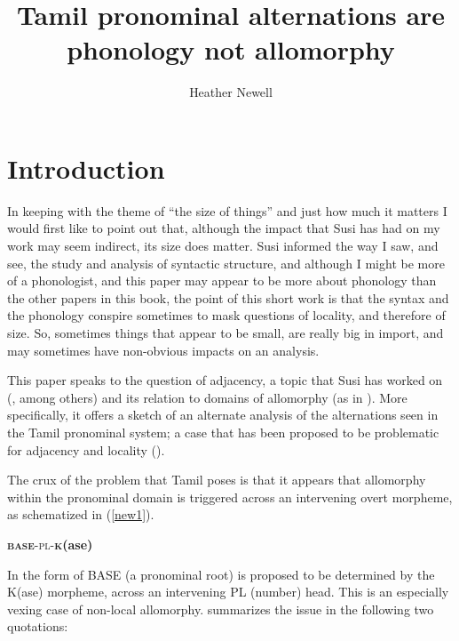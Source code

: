 \documentclass[output=paper]{langscibook}
\author{Heather Newell\affiliation{Université du Québec à Montréal}}
\title{Tamil pronominal alternations are phonology not allomorphy}
\begin{document}
\maketitle
\section{Introduction}

In keeping with the theme of “the size of things” and just how much it matters I would first like to point out that, although the impact that Susi has had on my work may seem indirect, its size does matter. Susi informed the way I saw, and see, the study and analysis of syntactic structure, and although I might be more of a phonologist, and this paper may appear to be more about phonology than the other papers in this book, the point of this short work is that the syntax and the phonology conspire sometimes to mask questions of locality, and therefore of size. So, sometimes things that appear to be small, are really big in import, and may sometimes have non-obvious impacts on an analysis.  

This paper speaks to the question of adjacency, a topic that Susi has worked on (\citealt{BobaljikWurmbrand2005newell,Wurmbrand2007newell}, among others) and its relation to domains of allomorphy (as in \citealt{BobaljikWurmbrand2013}). More specifically, it offers a sketch of an alternate analysis of the alternations seen in the Tamil pronominal system; a case that has been proposed to be problematic for adjacency and locality (\citealt{Moskal2015,moskal2016towards}). 

\begin{sloppypar}
The crux of the problem that Tamil poses is that it appears that allomorphy within the pronominal domain is triggered across an intervening overt morpheme, as schematized in (\ref{new1}).
\end{sloppypar}

\begin{exe}
\ex \label{new1}
 \textsc{\textbf{base}-pl-\textbf{k}}\textbf{(ase)}
\end{exe}

In  the form of BASE (a pronominal root) is proposed to be determined by the K(ase) morpheme, across an intervening PL (number) head. This is an especially vexing case of non-local allomorphy. \citeauthor{Moskal2015} summarizes the issue in the following two quotations:
\end{document}

